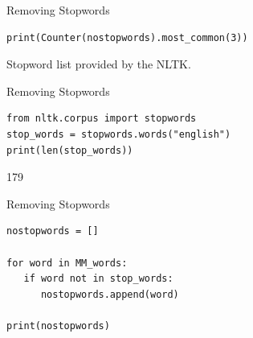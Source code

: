 \documentclass[handout]{beamer}
\begin{document}
\begin{frame}[fragile]{Removing Stopwords}
	
\begin{lstlisting}		
print(Counter(nostopwords).most_common(3))
\end{lstlisting}

\begin{lstlistingoutput}
[(',', 17), ('alive', 6), ('.', 2)]
\end{lstlistingoutput}

Stopword list provided by the NLTK.
	
	
\end{frame}



\begin{frame}[fragile]{Removing Stopwords}
	
\begin{lstlisting}		
from nltk.corpus import stopwords
stop_words = stopwords.words("english")
print(len(stop_words))
\end{lstlisting}
	
\begin{lstlistingoutput}
179
\end{lstlistingoutput}

\end{frame}



\begin{frame}[fragile]{Removing Stopwords}
	
\begin{lstlisting}		
nostopwords = []

for word in MM_words:
   if word not in stop_words:
      nostopwords.append(word)

print(nostopwords)
\end{lstlisting}
	
\begin{lstlistingoutput}
\end{lstlistingoutput}
	
\end{frame}
\end{document}

